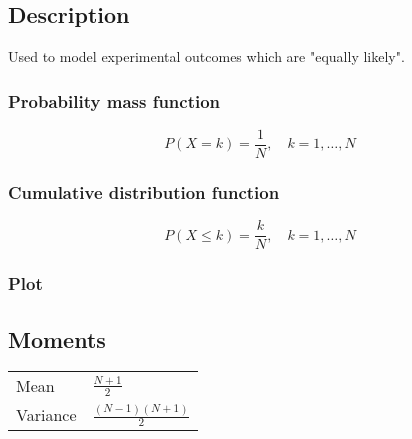 \subsection{Description}
Used to model experimental outcomes which are "equally likely".

\subsubsection{Probability mass function}
$$P(X=k)=\frac{1}{N},\quad k=1,\ldots,N$$

\subsubsection{Cumulative distribution function}
$$P(X \leq k)=\frac{k}{N},\quad k=1,\ldots,N$$

\subsubsection{Plot}

\subsection{Moments}
\begin{center}
	\begin{tabular}{l l}
		Mean & $\frac{N+1}{2}$ \\
		Variance & $\frac{(N-1)(N+1)}{2}$\\
	\end{tabular}
\end{center}
